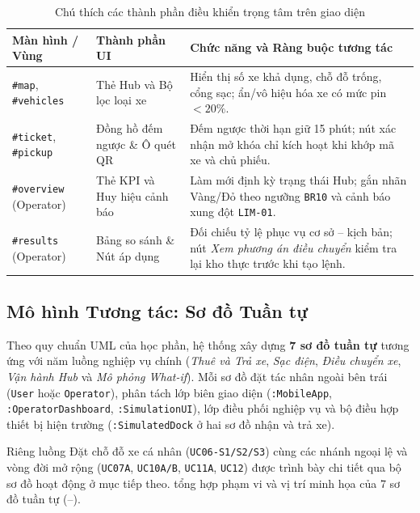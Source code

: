 \begin{table}[H]
\centering
\caption{Chú thích các thành phần điều khiển trọng tâm trên giao diện}
\label{tab:ui-components}
\begin{tabularx}{\textwidth}{>{\raggedright\arraybackslash}p{3.4cm} >{\raggedright\arraybackslash}p{3.6cm} >{\raggedright\arraybackslash}X}
\toprule
\textbf{Màn hình / Vùng} & \textbf{Thành phần UI} & \textbf{Chức năng và Ràng buộc tương tác} \\
\midrule
\texttt{\#map}, \texttt{\#vehicles} & Thẻ Hub và Bộ lọc loại xe & Hiển thị số xe khả dụng, chỗ đỗ trống, cổng sạc; ẩn/vô hiệu hóa xe có mức pin $< 20\%$. \\
\texttt{\#ticket}, \texttt{\#pickup} & Đồng hồ đếm ngược \& Ô quét QR & Đếm ngược thời hạn giữ 15 phút; nút xác nhận mở khóa chỉ kích hoạt khi khớp mã xe và chủ phiếu. \\
\texttt{\#overview} (Operator) & Thẻ KPI và Huy hiệu cảnh báo & Làm mới định kỳ trạng thái Hub; gắn nhãn Vàng/Đỏ theo ngưỡng \texttt{BR10} và cảnh báo xung đột \texttt{LIM-01}. \\
\texttt{\#results} (Operator) & Bảng so sánh \& Nút áp dụng & Đối chiếu tỷ lệ phục vụ cơ sở -- kịch bản; nút \textit{Xem phương án điều chuyển} kiểm tra lại kho thực trước khi tạo lệnh. \\
\bottomrule
\end{tabularx}
\end{table}

\subsection{Mô hình Tương tác: Sơ đồ Tuần tự}

Theo quy chuẩn UML của học phần, hệ thống xây dựng \textbf{7 sơ đồ tuần tự} tương ứng với năm luồng nghiệp vụ chính (\textit{Thuê và Trả xe}, \textit{Sạc điện}, \textit{Điều chuyển xe}, \textit{Vận hành Hub} và \textit{Mô phỏng What-if}). Mỗi sơ đồ đặt tác nhân ngoài bên trái (\texttt{User} hoặc \texttt{Operator}), phân tách lớp biên giao diện (\texttt{:MobileApp}, \texttt{:OperatorDashboard}, \texttt{:SimulationUI}), lớp điều phối nghiệp vụ và bộ điều hợp thiết bị hiện trường (\texttt{:SimulatedDock} ở hai sơ đồ nhận và trả xe).

Riêng luồng Đặt chỗ đỗ xe cá nhân (\texttt{UC06-S1/S2/S3}) cùng các nhánh ngoại lệ và vòng đời mở rộng (\texttt{UC07A}, \texttt{UC10A/B}, \texttt{UC11A}, \texttt{UC12}) được trình bày chi tiết qua bộ sơ đồ hoạt động ở mục tiếp theo.  tổng hợp phạm vi và vị trí minh họa của 7 sơ đồ tuần tự (--).

